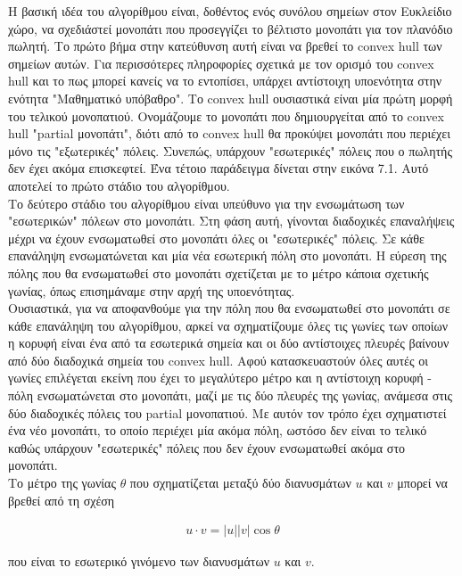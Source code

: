 \documentclass[oneside,12pt]{book}
\theoremstyle{definition}
\begin{document}
Η βασική ιδέα του αλγορίθμου είναι, δοθέντος ενός συνόλου σημείων στον Ευκλείδιο χώρο, να σχεδιάστεί μονοπάτι που προσεγγίζει το βέλτιστο μονοπάτι για τον πλανόδιο πωλητή. Το πρώτο βήμα στην κατεύθυνση αυτή είναι να βρεθεί το convex hull των σημείων αυτών. Για περισσότερες πληροφορίες σχετικά με τον ορισμό του convex hull και το πως μπορεί κανείς να το εντοπίσει, υπάρχει αντίστοιχη υποενότητα στην ενότητα "Μαθηματικό υπόβαθρο". Το convex hull ουσιαστικά είναι μία πρώτη μορφή του τελικού μονοπατιού. Ονομάζουμε το μονοπάτι που δημιουργείται από το convex hull "partial μονοπάτι", διότι από το convex hull θα προκύψει μονοπάτι που περιέχει μόνο τις "εξωτερικές" πόλεις. Συνεπώς, υπάρχουν "εσωτερικές" πόλεις που ο πωλητής δεν έχει ακόμα επισκεφτεί. Ένα τέτοιο παράδειγμα δίνεται στην εικόνα 7.1. Αυτό αποτελεί το πρώτο στάδιο του αλγορίθμου. \\

Το δεύτερο στάδιο του αλγορίθμου είναι υπεύθυνο για την ενσωμάτωση των "εσωτερικών" πόλεων στο μονοπάτι. Στη φάση αυτή, γίνονται διαδοχικές επαναλήψεις μέχρι να έχουν ενσωματωθεί στο μονοπάτι όλες οι "εσωτερικές" πόλεις. Σε κάθε επανάληψη ενσωματώνεται και μία νέα εσωτερική πόλη στο μονοπάτι. Η εύρεση της πόλης που θα ενσωματωθεί στο μονοπάτι σχετίζεται με το μέτρο κάποια σχετικής γωνίας, όπως επισημάναμε στην αρχή της υποενότητας. \\

Ουσιαστικά, για να αποφανθούμε για την πόλη που θα ενσωματωθεί στο μονοπάτι σε κάθε επανάληψη του αλγορίθμου, αρκεί να σχηματίζουμε όλες τις γωνίες των οποίων η κορυφή είναι ένα από τα εσωτερικά σημεία και οι δύο αντίστοιχες πλευρές βαίνουν από δύο διαδοχικά σημεία του convex hull. Αφού κατασκευαστούν όλες αυτές οι γωνίες επιλέγεται εκείνη που έχει το μεγαλύτερο μέτρο και η αντίστοιχη κορυφή - πόλη ενσωματώνεται στο μονοπάτι, μαζί με τις δύο πλευρές της γωνίας, ανάμεσα στις δύο διαδοχικές πόλεις του partial μονοπατιού. Με αυτόν τον τρόπο έχει σχηματιστεί ένα νέο μονοπάτι, το οποίο περιέχει μία ακόμα πόλη, ωστόσο δεν είναι το τελικό καθώς υπάρχουν "εσωτερικές" πόλεις που δεν έχουν ενσωματωθεί ακόμα στο μονοπάτι. \\

Το μέτρο της γωνίας \(θ\) που σχηματίζεται μεταξύ δύο διανυσμάτων \(u\) και \(v\) μπορεί να βρεθεί από τη σχέση

\begin{align*}
	u \cdot v = |u||v|\cos θ
\end{align*}

που είναι το εσωτερικό γινόμενο των διανυσμάτων \(u\) και \(v\). \\
\end{document}
